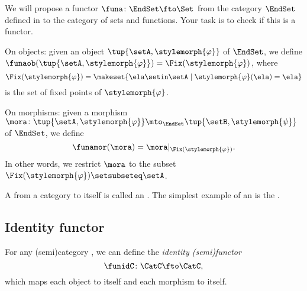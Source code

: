 
\begin{gradedexercise}
    \label{ex:fixed-point-functor}

    We will propose a functor $\funa \colon \EndSet \fto \Set$ from the category $\EndSet$ defined in  to the category of sets and functions.
    Your task is to check if this is a functor.

    On objects: given an object $\tup{\setA, \stylemorph{\varphi}}$ of $\EndSet$, we define $\funaob( \tup{\setA, \stylemorph{\varphi}}) = \Fix(\stylemorph{\varphi})$, where
    \begin{equation}
        \Fix(\stylemorph{\varphi}) = \makeset{\ela \setin \setA \mid \stylemorph{\varphi}(\ela) = \ela}
    \end{equation}
    is the set of fixed points of $\stylemorph{\varphi}$.

    On morphisms: given a morphism $\mora \colon \tup{\setA, \stylemorph{\varphi}} \mto_\EndSet \tup{\setB, \stylemorph{\psi}}$ of $\EndSet$, we define
    \begin{equation}
        \funamor(\mora) = \mora \vert_{\Fix(\stylemorph{\varphi})}.
    \end{equation}
    In other words, we restrict $\mora$ to the subset $\Fix(\stylemorph{\varphi}) \setsubseteq \setA$.

\end{gradedexercise}


A  from a category to itself is called an .
The simplest example of an  is the .

\subsection{Identity functor}
\label{sec:identity-functor}

\begin{definition}\label{def:identity-semifunctor}
    For any (semi)category \CatC, we can define the \emph{identity (semi)functor}
    \begin{equation}
        \funidC \colon \CatC \fto \CatC,
    \end{equation}
    which maps each object to itself and each morphism to itself.
\end{definition}

